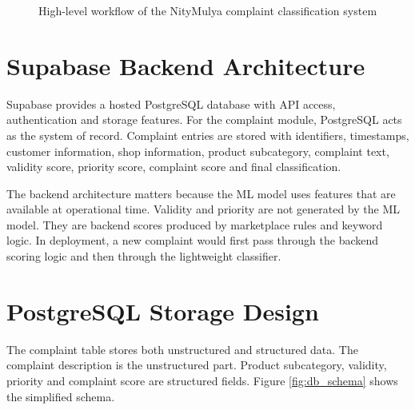 \documentclass[12pt,a4paper,openany]{book}
\begin{document}
\begin{figure}[H]
\centering
{}
\caption{High-level workflow of the NityMulya complaint classification system}
\label{fig:system_workflow}
\end{figure}

\section{Supabase Backend Architecture}
Supabase provides a hosted PostgreSQL database with API access, authentication and storage features. For the complaint module, PostgreSQL acts as the system of record. Complaint entries are stored with identifiers, timestamps, customer information, shop information, product subcategory, complaint text, validity score, priority score, complaint score and final classification.

The backend architecture matters because the ML model uses features that are available at operational time. Validity and priority are not generated by the ML model. They are backend scores produced by marketplace rules and keyword logic. In deployment, a new complaint would first pass through the backend scoring logic and then through the lightweight classifier.

\section{PostgreSQL Storage Design}
The complaint table stores both unstructured and structured data. The complaint description is the unstructured part. Product subcategory, validity, priority and complaint score are structured fields. Figure \ref{fig:db_schema} shows the simplified schema.
\end{document}
